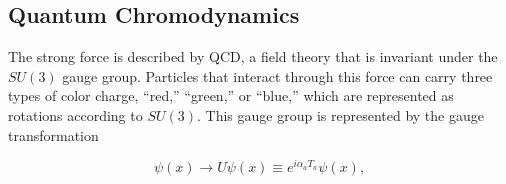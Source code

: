 







\subsection{Quantum Chromodynamics}
\label{sec:QuantumChromo}

The strong force is described by QCD, a field theory that is invariant under the $SU(3)$ gauge group. Particles that interact through this force can carry three types of color charge, ``red,'' ``green,'' or ``blue,'' which are represented as rotations according to $SU(3)$. This gauge group is represented by the gauge transformation

\begin{equation}
\psi(x)\rightarrow U\psi(x)\equiv e^{i\alpha_{a}T_{a}}\psi(x),
\end{equation}

